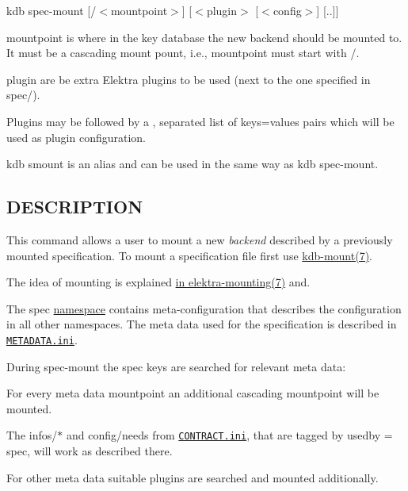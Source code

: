 {\ttfamily kdb spec-\/mount \mbox{[}/$<$mountpoint$>$\mbox{]} \mbox{[}$<$plugin$>$ \mbox{[}$<$config$>$\mbox{]} \mbox{[}..\mbox{]}\mbox{]}}


\begin{DoxyItemize}
\item {\ttfamily mountpoint} is where in the key database the new backend should be mounted to. It must be a cascading mount pount, i.\+e., {\ttfamily mountpoint} must start with {\ttfamily /}.
\item {\ttfamily plugin} are be extra Elektra plugins to be used (next to the one specified in {\ttfamily spec/}).
\item Plugins may be followed by a {\ttfamily ,} separated list of {\ttfamily keys=values} pairs which will be used as plugin configuration.
\end{DoxyItemize}

{\ttfamily kdb smount} is an alias and can be used in the same way as {\ttfamily kdb spec-\/mount}.

\subsection*{D\+E\+S\+C\+R\+I\+P\+T\+I\+O\+N}

This command allows a user to mount a new {\itshape backend} described by a previously mounted specification. To mount a specification file first use \hyperlink{md_doc_help_kdb-mount_doc_help_kdb-mount_md}{kdb-\/mount(7)}.

The idea of mounting is explained \hyperlink{md_doc_help_elektra-mounting_doc_help_elektra-mounting_md}{in elektra-\/mounting(7)} and.

The {\ttfamily spec} \hyperlink{md_doc_help_elektra-namespaces_doc_help_elektra-namespaces_md}{namespace} contains meta-\/configuration that describes the configuration in all other namespaces. The meta data used for the specification is described in \href{/home/markus/Projekte/Elektra/current/doc/METADATA.ini}{\tt M\+E\+T\+A\+D\+A\+T\+A.\+ini}.

During {\ttfamily spec-\/mount} the {\ttfamily spec} keys are searched for relevant meta data\+:


\begin{DoxyItemize}
\item For every meta data {\ttfamily mountpoint} an additional cascading mountpoint will be mounted.
\item The {\ttfamily infos/$\ast$} and {\ttfamily config/needs} from \href{/home/markus/Projekte/Elektra/current/doc/CONTRACT.ini}{\tt C\+O\+N\+T\+R\+A\+C\+T.\+ini}, that are tagged by {\ttfamily usedby = spec}, will work as described there.
\item For other meta data suitable plugins are searched and mounted additionally.
\end{DoxyItemize}

